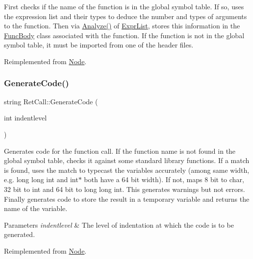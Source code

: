 First checks if the name of the function is in the global symbol table. If so, uses the expression list and their types to deduce the number and types of arguments to the function. Then via \hyperlink{class_ret_call_ae97ba198b2aff2badbee17b2f02d989a}{Analyze()} of \hyperlink{class_expr_list}{Expr\+List}, stores this information in the \hyperlink{class_func_body}{Func\+Body} class associated with the function. If the function is not in the global symbol table, it must be imported from one of the header files. 

Reimplemented from \hyperlink{class_node_a5f88d55c6f253a29def7ccc443d83d47}{Node}.

\mbox{\label{class_ret_call_a4bb2cb50dc6e81aaf3a312c228cb5f4e}} 
\subsubsection{\texorpdfstring{Generate\+Code()}{GenerateCode()}}
{\footnotesize\ttfamily string Ret\+Call\+::\+Generate\+Code (\begin{DoxyParamCaption}\item[{int}]{indentlevel }\end{DoxyParamCaption})\hspace{0.3cm}{\ttfamily [virtual]}}

Generates code for the function call. If the function name is not found in the global symbol table, checks it against some standard library functions. If a match is found, uses the match to typecast the variables accurately (among same width, e.\+g. long long int and int$\ast$ both have a 64 bit width). If not, maps 8 bit to char, 32 bit to int and 64 bit to long long int. This generates warnings but not errors. Finally generates code to store the result in a temporary variable and returns the name of the variable. 
\begin{DoxyParams}{Parameters}
{\em indentlevel} & The level of indentation at which the code is to be generated. \\
\hline
\end{DoxyParams}


Reimplemented from \hyperlink{class_node_acb60e526730e8436056375a3055c2c32}{Node}.

\mbox{\label{class_ret_call_afb92899368ccb84bad8d95c1a8a57e93}} 
